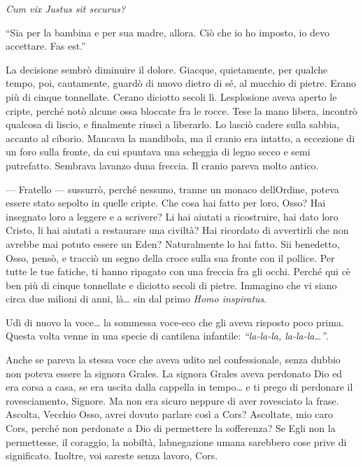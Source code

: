 \emph{Cum vix Justus sit securus?}

``Sia per la bambina e per sua madre, allora. Ciò che io ho imposto, io
devo accettare. Fas est.''

La decisione sembrò diminuire il dolore. Giacque, quietamente, per
qualche tempo, poi, cautamente, guardò di nuovo dietro di sé, al mucchio
di pietre. Erano più di cinque tonnellate. C\textquotesingle erano
diciotto secoli lì. L\textquotesingle esplosione aveva aperto le cripte,
perché notò alcune ossa bloccate fra le rocce. Tese la mano libera,
incontrò qualcosa di liscio, e finalmente riuscì a liberarlo. Lo lasciò
cadere sulla sabbia, accanto al ciborio. Mancava la mandibola, ma il
cranio era intatto, a eccezione di un foro sulla fronte, da cui spuntava
una scheggia di legno secco e semi putrefatto. Sembrava
l\textquotesingle avanzo d\textquotesingle una freccia. Il cranio pareva
molto antico.

--- Fratello --- sussurrò, perché nessuno, tranne un monaco
dell\textquotesingle Ordine, poteva essere stato sepolto in quelle
cripte. Che cosa hai fatto per loro, Osso? Hai insegnato loro a leggere
e a scrivere? Li hai aiutati a ricostruire, hai dato loro Cristo, li hai
aiutati a restaurare una civiltà? Hai ricordato di avvertirli che non
avrebbe mai potuto essere un Eden? Naturalmente lo hai fatto. Sii
benedetto, Osso, pensò, e tracciò un segno della croce sulla sua fronte
con il pollice. Per tutte le tue fatiche, ti hanno ripagato con una
freccia fra gli occhi. Perché qui c\textquotesingle è ben più di cinque
tonnellate e diciotto secoli di pietre. Immagino che vi siano circa due
milioni di anni, là\ldots{} sin dal primo \emph{Homo inspiratus}.

Udì di nuovo la voce\ldots{} la sommessa voce-eco che gli aveva risposto
poco prima. Questa volta venne in una specie di cantilena infantile:
\emph{``la-la-la, la-la-la\ldots''}.

Anche se pareva la stessa voce che aveva udito nel confessionale, senza
dubbio non poteva essere la signora Grales. La signora Grales aveva
perdonato Dio ed era corsa a casa, se era uscita dalla cappella in
tempo\ldots{} e ti prego di perdonare il rovesciamento, Signore. Ma non
era sicuro neppure di aver rovesciato la frase. Ascolta, Vecchio Osso,
avrei dovuto parlare così a Cors? Ascoltate, mio caro Cors, perché non
perdonate a Dio di permettere la sofferenza? Se Egli non la permettesse,
il coraggio, la nobiltà, l\textquotesingle abnegazione umana sarebbero
cose prive di significato. Inoltre, voi sareste senza lavoro, Cors.

